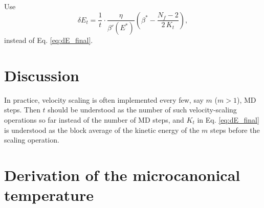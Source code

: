 \documentclass[reprint]{revtex4-1}
\begin{document}
Use
\begin{equation}
\delta E_t
=
\frac{ 1 } { t } \cdot
\frac{ \eta } { \beta'(E^*) }
\left(
 \beta^* -
 \frac{ N_f - 2 }
 { 2 \, K_t }
\right)
,
\label{eq:dE_eta}
\end{equation}
%
instead of Eq. \eqref{eq:dE_final}.


\section{Discussion}




In practice, velocity scaling is often implemented every few,
say $m$ ($m > 1$), MD steps.
%
Then $t$ should be understood as the number of
such velocity-scaling operations so far instead of
the number of MD steps, and $K_t$ in Eq. \eqref{eq:dE_final} is understood
as the block average of the kinetic energy of the $m$ steps
before the scaling operation.


\appendix


\section{Derivation of the microcanonical temperature}
\end{document}
